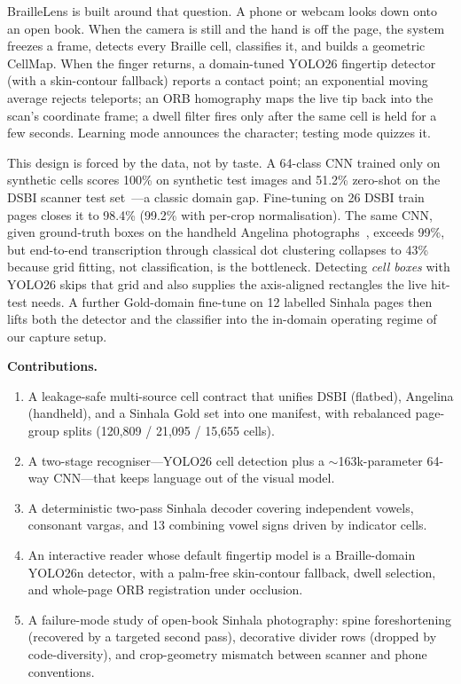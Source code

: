 \documentclass[conference]{IEEEtran}
\begin{document}
BrailleLens is built around that question. A phone or webcam looks down onto
an open book. When the camera is still and the hand is off the page, the
system freezes a frame, detects every Braille cell, classifies it, and
builds a geometric CellMap. When the finger returns, a domain-tuned YOLO26
fingertip detector (with a skin-contour fallback) reports a contact point;
an exponential moving average rejects teleports; an ORB homography maps the
live tip back into the scan's coordinate frame; a dwell filter fires only
after the same cell is held for a few seconds. Learning mode announces the
character; testing mode quizzes it.

This design is forced by the data, not by taste. A 64-class CNN trained only
on synthetic cells scores 100\% on synthetic test images and 51.2\%
zero-shot on the DSBI scanner test set~\cite{li2018dsbi}---a classic domain
gap. Fine-tuning on 26 DSBI train pages closes it to 98.4\% (99.2\% with
per-crop normalisation). The same CNN, given ground-truth boxes on the
handheld Angelina photographs~\cite{ovodov2021obr}, exceeds 99\%, but
end-to-end transcription through classical dot clustering collapses to
43\% because grid fitting, not classification, is the bottleneck. Detecting
\textit{cell boxes} with YOLO26 skips that grid and also supplies the
axis-aligned rectangles the live hit-test needs. A further Gold-domain
fine-tune on 12 labelled Sinhala pages then lifts both the detector and the
classifier into the in-domain operating regime of our capture setup.

\textbf{Contributions.}
\begin{enumerate}
\item A leakage-safe multi-source cell contract that unifies DSBI (flatbed),
Angelina (handheld), and a Sinhala Gold set into one manifest, with
rebalanced page-group splits (120{,}809 / 21{,}095 / 15{,}655 cells).
\item A two-stage recogniser---YOLO26 cell detection plus a $\sim$163k-parameter
64-way CNN---that keeps language out of the visual model.
\item A deterministic two-pass Sinhala decoder covering independent vowels,
consonant vargas, and 13 combining vowel signs driven by indicator cells.
\item An interactive reader whose default fingertip model is a Braille-domain
YOLO26n detector, with a palm-free skin-contour fallback, dwell selection,
and whole-page ORB registration under occlusion.
\item A failure-mode study of open-book Sinhala photography: spine
foreshortening (recovered by a targeted second pass), decorative divider
rows (dropped by code-diversity), and crop-geometry mismatch between
scanner and phone conventions.
\end{enumerate}
\end{document}
